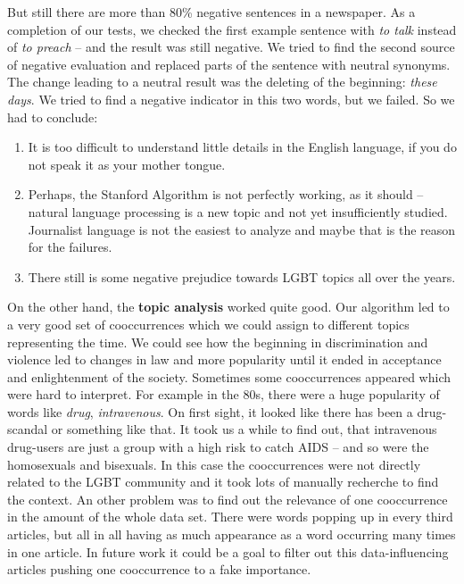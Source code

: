 \documentclass[10pt,a4paper,twocolumn]{scrartcl}
\begin{document}
But still there are more than 80\% negative sentences in a newspaper. As a completion of our tests, we checked the first example sentence with \textit{to talk} instead of \textit{to preach} -- and the result was still negative. We tried to find the second source of negative evaluation and replaced parts of the sentence with neutral synonyms. The change leading to a neutral result was the deleting of the beginning: \textit{these days}. We tried to find a negative indicator in this two words, but we failed. So we had to conclude:
\begin{enumerate}
\item It is too difficult to understand little details in the English language, if you do not speak it as your mother tongue.
\item Perhaps, the Stanford Algorithm is not perfectly working, as it should – natural language processing is a new topic and not yet insufficiently studied. Journalist language is not the easiest to analyze and maybe that is the reason for the failures.
\item There still is some negative prejudice towards LGBT topics all over the years.
\end{enumerate}

On the other hand, the \textbf{topic analysis} worked quite good. Our algorithm led to a very good set of cooccurrences which we could assign to different topics representing the time. We could see how the beginning in discrimination and violence led to changes in law and more popularity until it ended in acceptance and enlightenment of the society. Sometimes some cooccurrences appeared which were hard to interpret. For example in the 80s, there were a huge popularity of words like \textit{drug}, \textit{intravenous}. On first sight, it looked like there has been a drug-scandal or something like that. It took us a while to find out, that intravenous drug-users are just a group with a high risk to catch AIDS -- and so were the homosexuals and bisexuals. In this case the cooccurrences were not directly related to the LGBT community and it took lots of manually recherche to find the context. An other problem was to find out the relevance of one cooccurrence in the amount of the whole data set. There were words popping up in every third articles, but all in all having as much appearance as a word occurring many times in one article. In future work it could be a goal to filter out this data-influencing articles pushing one cooccurrence to a fake importance.
\end{document}
